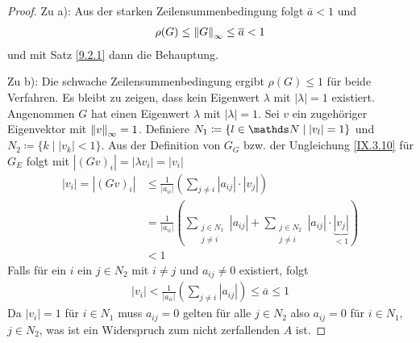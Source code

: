 \begin{Satze}[Zeilensummenkriterium]
\begin{proof}
Zu a): Aus der starken Zeilensummenbedingung folgt $\overline{a}<1$
und
\begin{gather*}
  \rho(G)\leq \left\| G \right\|_\infty \leq \overline{a}<1
\end{gather*}
und mit Satz \ref{9.2.1} dann die Behauptung.

Zu b): Die schwache Zeilensummenbedingung ergibt 
$\rho(G) \leq 1$ für beide Verfahren.
Es bleibt zu zeigen, dass kein Eigenwert $\lambda$ mit
$|\lambda|=1$ existiert.
Angenommen $G$ hat einen Eigenwert $\lambda$ mit $|\lambda|=1$.
Sei $v$ ein zugehöriger Eigenvektor mit $\left\| v \right\|_\infty=1$.
Definiere $N_1\coloneqq \{l\in\N \mid |v_l|=1\}$
und $N_2\coloneqq \{k\mid |v_k| <1\}$.
Aus der Definition von $G_G$ bzw. der Ungleichung \eqref{IX.3.10}
für $G_E$ folgt mit $|(Gv)_i| = |\lambda v_i| = |v_i|$
\begin{align*}
  |v_i| = |(Gv)_i| &\leq \frac{1}{|a_{ii}|}\left(
                     \sum_{j\neq i} |a_{ij}|\cdot |{v_j}|
                     \right) \\
                   &=\frac{1}{|a_{ii}|}\left(
                     \sum_{\substack{j\in N_1\\j\neq i}}|a_{ij}|
                     +\sum_{\substack{j\in N_2\\j\neq i}} |a_{ij}|
                     \cdot\underbrace{|{v_j}|}_{<1}
                     \right) \\
                   &<1
\end{align*}
Falls für ein $i$ ein $j\in N_2$ mit $i\neq j$ und $a_{ij}\neq 0$
existiert, folgt
\begin{gather*}
  |v_i| < \frac{1}{|a_{ii}|} \left( \sum_{j\neq i}|a_{ij}|\right)
  \leq \overline{a} \leq 1
\end{gather*}
Da $|v_i|=1$ für $i\in N_1$ muss $a_{ij}=0$ gelten für alle $j\in N_2$
also $a_{ij}=0$ für $i\in N_1$, $j\in N_2$,
was ist ein Widerspruch zum nicht zerfallenden $A$ ist.
\end{proof}
\end{Satze}




